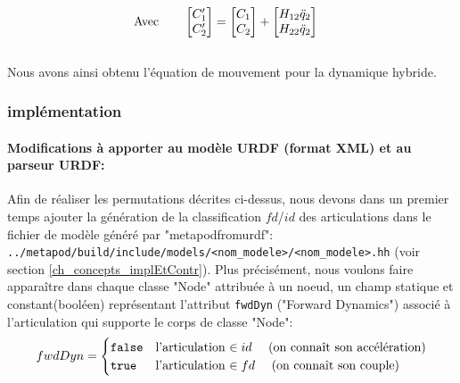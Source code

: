\documentclass{report}
\begin{document}
\begin{align}
&\textnormal{Avec} \qquad
\begin{bmatrix}
  C'_{1} \\
  C'_{2}
\end{bmatrix}
=
\begin{bmatrix}
  C_{1} \\
  C_{2}
\end{bmatrix}
+
\begin{bmatrix}
  H_{12} \ddot{q}_2 \\
  H_{22} \ddot{q}_2
\end{bmatrix} \label{equ_cPrime}
\end{align}
\\
Nous avons ainsi obtenu l'équation de mouvement pour la dynamique hybride.

\subsubsection{implémentation}

\paragraph{Modifications à apporter au modèle URDF (format XML) et au parseur URDF:}

Afin de réaliser les permutations décrites ci-dessus, nous devons dans un premier temps ajouter la génération de la classification $fd$/$id$ des articulations dans le fichier de modèle généré par "metapodfromurdf": \verb;../metapod/build/include/models/<nom_modele>/<nom_modele>.hh; (voir section \ref{ch_concepts_implEtContr}). Plus précisément, nous voulons faire apparaître dans chaque classe "Node" attribuée à un noeud, un champ statique et constant\footnotemark[1] (booléen) représentant l'attribut \verb;fwdDyn; ("Forward Dynamics") associé à l'articulation qui supporte le corps de classe "Node":
\begin{equation*}
fwdDyn = 
\begin{cases}
  \verb;false; & \textnormal{l'articulation $\in id \quad$ (on connaît son accélération)} \\
  \verb;true; & \textnormal{l'articulation $\in fd \quad$ (on connaît son couple)}
\end{cases}
\end{equation*}

\end{document}
